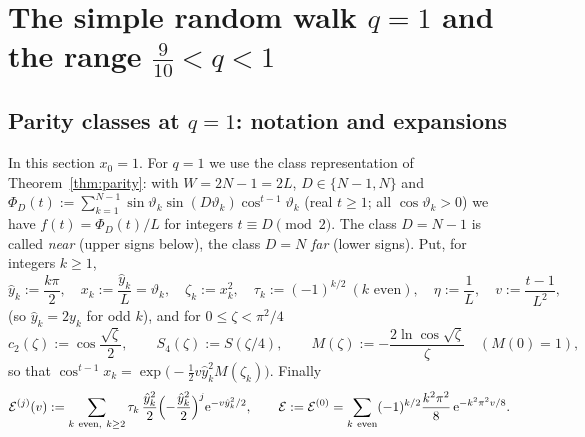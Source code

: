\documentclass[11pt,a4paper]{article}
\theoremstyle{definition}
\theoremstyle{remark}
\newcommand{\ee}{\mathrm{e}}
\begin{document}
\section{The simple random walk \texorpdfstring{$q=1$}{q=1} and the range \texorpdfstring{$\frac9{10}<q<1$}{9/10<q<1}}\label{sec:global}

\subsection{Parity classes at \texorpdfstring{$q=1$}{q=1}: notation and expansions}

In this section $x_0=1$. For $q=1$ we use the class representation of Theorem~\ref{thm:parity}: with $W=2N-1=2L$,
$D\in\{N-1,N\}$ and $\Phi_D(t):=\sum_{k=1}^{N-1}\sin\vartheta_k\sin(D\vartheta_k)\cos^{t-1}\vartheta_k$ (real $t\ge1$;
all $\cos\vartheta_k>0$) we have $f(t)=\Phi_D(t)/L$ for integers $t\equiv D\pmod 2$. The class $D=N-1$ is called
\emph{near} (upper signs below), the class $D=N$ \emph{far} (lower signs). Put, for integers $k\ge1$,
\[
  \hat y_k:=\frac{k\pi}2,\quad x_k:=\frac{\hat y_k}{L}=\vartheta_k,\quad\zeta_k:=x_k^2,\quad
  \tau_k:=(-1)^{k/2}\ (k\text{ even}),\quad\eta:=\frac1L,\quad v:=\frac{t-1}{L^2},
\]
(so $\hat y_k=2y_k$ for odd $k$), and for $0\le\zeta<\pi^2/4$
\[
  c_2(\zeta):=\cos\frac{\sqrt\zeta}2,\qquad S_4(\zeta):=S(\zeta/4),\qquad
  M(\zeta):=-\frac{2\ln\cos\sqrt\zeta}{\zeta}\quad(M(0)=1),
\]
so that $\cos^{t-1}x_k=\exp\bigl(-\tfrac12v\hat y_k^2M(\zeta_k)\bigr)$. Finally
\begin{equation}\label{eq:calE}
  \mathcal E^{(j)}(v):=\sum_{k\ \mathrm{even},\ k\ge2}\tau_k\,\frac{\hat y_k^2}2\Bigl(-\frac{\hat y_k^2}2\Bigr)^{j}
     \ee^{-v\hat y_k^2/2},\qquad \mathcal E:=\mathcal E^{(0)}=\sum_{k\ \rm even}(-1)^{k/2}\frac{k^2\pi^2}{8}\,\ee^{-k^2\pi^2v/8}.
\end{equation}
\end{document}
